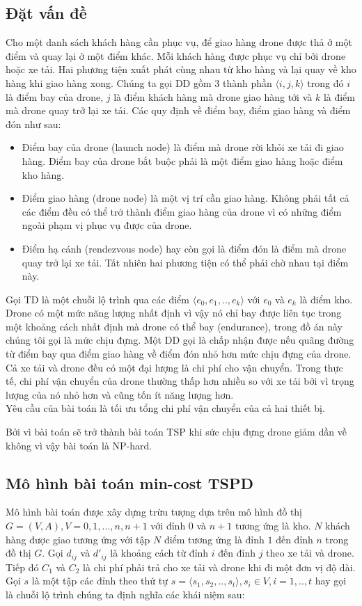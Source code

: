 \documentclass[a4paper,12pt]{report}
\begin{document}
\subsection{Đặt vấn đề}
Cho một danh sách khách hàng cần phục vụ, để giao hàng drone được thả ở một điểm và quay lại ở một điểm khác. Mỗi khách hàng được phục vụ chỉ bởi drone hoặc xe tải. Hai phương tiện xuất phát cùng nhau từ kho hàng và lại quay về kho hàng khi giao hàng xong. Chúng ta gọi \ac{DD} gồm 3 thành phần $\langle i,j,k \rangle$ trong đó $i$ là điểm bay của drone, $j$ là điểm khách hàng mà drone giao hàng tới và $k$ là điểm mà drone quay trở lại xe tải. Các quy định về điểm bay, điểm giao hàng và điểm đón như sau:
\begin{itemize}
\item Điểm bay của drone (launch node) là điểm mà drone rời khỏi xe tải đi giao hàng. Điểm bay của drone bắt buộc phải là một điểm giao hàng hoặc điểm kho hàng. 
\item Điểm giao hàng (drone node) là một vị trí cần giao hàng. Không phải tất cả các điểm đều có thể trở thành điểm giao hàng của drone vì có những điểm ngoài phạm vị phục vụ được của drone.
\item Điểm hạ cánh (rendezvous node) hay còn gọi là điểm đón là điểm mà drone quay trở lại xe tải. Tất nhiên hai phương tiện có thể phải chờ nhau tại điểm này.
\end{itemize}
Gọi  \ac{TD} là một chuỗi lộ trình qua các điểm $\langle e_0,e_1,..,e_k \rangle $ với $e_0$ và $e_k$ là điểm kho.
Drone có một mức năng lượng nhất định vì vậy nó chỉ bay được liên tục trong một khoảng cách nhất định mà drone có thể bay (endurance), trong đồ án này chúng tôi gọi là mức chịu đựng. Một \ac{DD} gọi là chấp nhận được nếu quãng đường từ điểm bay qua điểm giao hàng về điểm đón nhỏ hơn mức chịu đựng của drone. Cả xe tải và drone đều có một đại lượng là chi phí cho vận chuyển. Trong thực tế, chi phí vận chuyển của drone thường thấp hơn nhiều so với xe tải bởi vì trọng lượng của nó nhỏ hơn và cũng tốn ít năng lượng hơn. \\

Yêu cầu của bài toán là tối ưu tổng chi phí vận chuyển của cả hai thiết bị. 

Bởi vì bài toán sẽ trở thành bài toán TSP khi sức chịu đựng drone giảm dần về không vì vậy bài toán là NP-hard. 

\subsection{Mô hình bài toán min-cost TSPD}
Mô hình bài toán được xây dựng trừu tượng dựa trên mô hình đồ thị $G=(V,A), V={0,1,...,n,n+1}$ với đỉnh $0$ và $n+1$ tương ứng là kho. $N$ khách hàng được giao tương ứng với tập $N$ điểm tương ứng là đỉnh $1$ đến đỉnh $n$ trong đồ thị $G$. Gọi $d_{ij}$ và $d'_{ij}$ là khoảng cách từ đỉnh $i$ đến đỉnh $j$ theo xe tải và drone. Tiếp đó $C_1$ và $C_2$ là chi phí phải trả cho xe tải và drone khi đi một đơn vị độ dài.  
Gọi $s$ là một tập các đỉnh theo thứ tự $s=\langle s_1,s_2,..,s_t \rangle , s_i \in V, i=1,..,t$ hay gọi là chuỗi lộ trình chúng ta định nghĩa các khái niệm sau:
\end{document}
